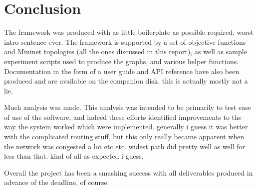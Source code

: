 \chapter{Conclusion}
\label{ch:conclusion}

The framework was produced with as little boilerplate as possible required. worst intro sentence ever. The framework is supported by a set of objective functions and Mininet topologies (all the ones discussed in this report), as well as sample experiment scripts used to produce the graphs, and various helper functions. Documentation in the form of a user guide and API reference have also been produced and are available on the companion disk. this is actually mostly not a lie.

Much analysis was made. This analysis was intended to be primarily to test ease of use of the software, and indeed these efforts identified improvements to the way the system worked which were implemented. generally i guess it was better with the complicated routing stuff, but this only really became apparent when the network was congested a lot etc etc. widest path did pretty well as well for less than that. kind of all as expected i guess.

Overall the project has been a smashing success with all deliverables produced in advance of the deadline. of course.
